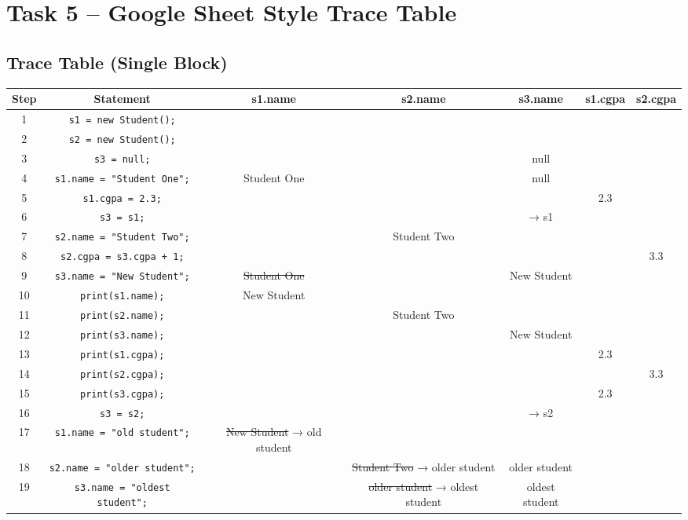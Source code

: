 \documentclass{article}
\begin{document}
\section*{Task 5 -- Google Sheet Style Trace Table}

\subsection*{Trace Table (Single Block)}

\begin{tabular}{|c|c|c|c|c|c|c|}
\hline
\textbf{Step} & \textbf{Statement} & \textbf{s1.name} & \textbf{s2.name} & \textbf{s3.name} & \textbf{s1.cgpa} & \textbf{s2.cgpa} \\
\hline
1 & \texttt{s1 = new Student();} &  &  &  &  &  \\
2 & \texttt{s2 = new Student();} &  &  &  &  &  \\
3 & \texttt{s3 = null;} &  &  & null &  &  \\
4 & \texttt{s1.name = "Student One";} & Student One &  & null &  &  \\
5 & \texttt{s1.cgpa = 2.3;} &  &  &  & 2.3 &  \\
6 & \texttt{s3 = s1;} &  &  & → s1 &  &  \\
7 & \texttt{s2.name = "Student Two";} &  & Student Two &  &  &  \\
8 & \texttt{s2.cgpa = s3.cgpa + 1;} &  &  &  &  & 3.3 \\
9 & \texttt{s3.name = "New Student";} & \sout{Student One} &  & New Student &  &  \\
10 & \texttt{print(s1.name);} & New Student &  &  &  &  \\
11 & \texttt{print(s2.name);} &  & Student Two &  &  &  \\
12 & \texttt{print(s3.name);} &  &  & New Student &  &  \\
13 & \texttt{print(s1.cgpa);} &  &  &  & 2.3 &  \\
14 & \texttt{print(s2.cgpa);} &  &  &  &  & 3.3 \\
15 & \texttt{print(s3.cgpa);} &  &  &  & 2.3 &  \\
16 & \texttt{s3 = s2;} &  &  & → s2 &  &  \\
17 & \texttt{s1.name = "old student";} & \sout{New Student} → old student &  &  &  &  \\
18 & \texttt{s2.name = "older student";} &  & \sout{Student Two} → older student & older student &  &  \\
19 & \texttt{s3.name = "oldest student";} &  & \sout{older student} → oldest student & oldest student &  &  \\

\end{tabular}
\end{document}
